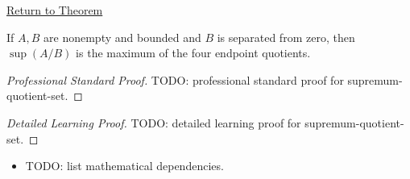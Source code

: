 \newpage
{}
\label{prf:supremum-quotient-set}

\begin{remark*}[Return]
\hyperref[thm:supremum-quotient-set]{Return to Theorem}
\end{remark*}

\begin{theorem*}
If $A,B$ are nonempty and bounded and $B$ is separated from zero, then
$\sup(A/B)$ is the maximum of the four endpoint quotients.
\end{theorem*}

\begin{proof}[Professional Standard Proof]
\LRAProofBodyStart
TODO: professional standard proof for supremum-quotient-set.
\end{proof}

\begin{proof}[Detailed Learning Proof]
\LRAProofBodyStart
TODO: detailed learning proof for supremum-quotient-set.
\end{proof}

\begin{remark*}
\end{remark*}

\begin{dependencies}
\begin{itemize}
  \item TODO: list mathematical dependencies.
\end{itemize}
\end{dependencies}

\clearpage
